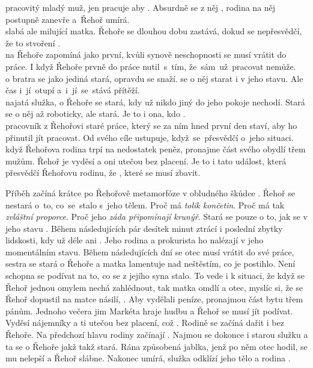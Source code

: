 \documentclass{extarticle} %
\begin{document}
\noindent 
{} pracovitý mladý muž,
jen pracuje aby .
Absurdně se z něj ,
rodina na něj postupně zanevře a~Řehoř umírá. \\
 slabá ale milující matka.
Řehoře se dlouhou dobu zastává, dokud se nepřesvědčí,
že to stvoření . \\
 na Řehoře zapomíná jako první,
kvůli synově neschopnosti se musí vrátit do práce.
I když Řehoře prvně do práce nutil~s~tím, že~sám~už~pracovat nemůže. \\
 o bratra se jako jediná stará, opravdu se snaží.
 se o něj starat i v jeho stavu.
Ale čas i~jí~otupí a~i~jí~se~stává přítěží. \\
 najatá služka, o Řehoře se stará,
kdy už nikdo jiný do jeho pokoje nechodí.
Stará se o něj až roboticky, ale stará.
Je to i ona, kdo . \\
 pracovník z Řehořovi staré práce,
který se za ním hned první den staví, aby ho přinutil jít pracovat.
Od svého cíle ustupuje, když~se~přesvědčí o~jeho situaci. \\
 když Řehořova rodina trpí na nedostatek peněz,
pronajme část svého obydlí třem mužům.
Řehoř je vyděsí a oni utečou bez placení.
Je to i tato událost, která přesvědčí Řehořovu rodinu,
že , které se musí zbavit.

\noindent Příběh začíná krátce po Řehořově metamorfóze v obludného škůdce
.
Řehoř se nestará o~to, co~se~stalo s~jeho tělem.
Proč má \textit{tolik končetin}.
Proč má tak \textit{zvláštní proporce}.
Proč jeho \textit{záda připomínají krunýř}.
Stará se pouze o to, jak se v jeho stavu .
Během následujících pár desítek minut ztrácí i poslední zbytky lidskosti,
kdy už déle ani .
Jeho rodina a prokurista ho nalézají v jeho momentálním stavu.
Během následujících dní se otec musí vrátit do své práce,
sestra se stará o Řehoře a matka lamentuje nad neštěstím, co je postihlo.
Není schopna se podívat na to, co se z jejího syna stalo.
To vede i k situaci, že když se Řehoř jednou omylem nechá zahlédnout,
tak matka omdlí a otec, myslíc si, že se Řehoř dopustil na matce násilí,
.
Aby vydělali peníze, pronajmou část bytu třem pánům.
Jednoho večera jim Markéta hraje hudbu a Řehoř se musí jít podívat.
Vyděsí nájemníky a ti utečou bez placení, což .
Rodině se začíná dařit i bez Řehoře.
Na předchozí hlavu rodiny začínají .
Najmou se dokonce i starou služku a ta se o Řehoře jakž takž stará.
Rána způsobená jablka, jenž po něm otec hodil, se mu nelepší a Řehoř slábne.
Nakonec umírá, služka odklízí jeho tělo a rodina .
\end{document}
